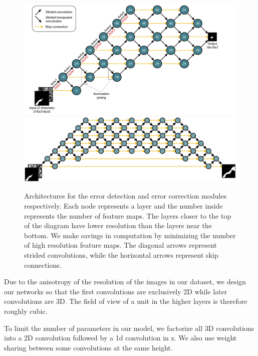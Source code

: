 \documentclass{article}
\begin{document}
\begin{appendices}
\begin{figure}
\centering
\includegraphics[width=1.0\linewidth]{detector.pdf}
\centering
\includegraphics[width=1.0\linewidth]{corrector2.pdf}

\caption{Architectures for the error detection and error correction modules respectively. Each node represents a layer and the number inside represents the number of feature maps. The layers closer to the top of the diagram have lower resolution than the layers near the bottom. We make savings in computation by minimizing the number of high resolution feature maps. The diagonal arrows represent strided convolutions, while the horizontal arrows represent skip connections.}
\label{fig:architecture}
\end{figure}

Due to the anisotropy of the resolution of the images in our dataset, we design our networks so that the first convolutions are exclusively 2D while later convolutions are 3D. The field of view of a unit in the higher layers is therefore roughly cubic.

To limit the number of parameters in our model, we factorize all 3D convolutions into a 2D convolution followed by a 1d convolution in z. We also use weight sharing between some convolutions at the same height.


\end{appendices}
\end{document}
